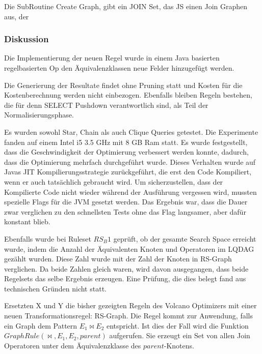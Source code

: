 Die SubRoutine Create Graph, gibt ein JOIN Set, das JS einen Join Graphen aus, der




\subsubsection{Diskussion}
Die Implementierung der neuen Regel wurde in einem Java basierten regelbasierten Op den Äquivalenzklassen neue Felder hinzugefügt werden.

Die Generierung der Resultate findet ohne Pruning statt und Kosten für die Kostenberechnung werden nicht einbezogen. Ebenfalls bleiben Regeln bestehen, die für denn SELECT Pushdown verantwortlich sind, als Teil der Normalisierungsphase. 

Es wurden sowohl Star, Chain als auch Clique Queries getestet. Die Experimente fanden auf einem Intel i5 3.5 GHz mit 8 GB Ram statt. Es wurde festgestellt, dass die Geschwindigkeit der Optimierung verbessert werden konnte, dadurch, dass die Optimierung mehrfach durchgeführt wurde. Dieses Verhalten wurde auf Javas JIT Kompilierungsstrategie zurückgeführt, die erst den Code Kompiliert, wenn er auch tatsächlich gebraucht wird. Um sicherzustellen, dass der Kompilierte Code nicht wieder während der Ausführung vergessen wird, mussten spezielle Flags für die JVM gesetzt werden. Das Ergebnis war, dass die Dauer zwar verglichen zu den schnellsten Tests ohne das Flag langsamer, aber dafür konstant blieb.

Ebenfalls wurde bei Ruleset $RS_B1$ geprüft, ob der gesamte Search Space erreicht wurde, indem die Anzahl der Äquivalenten Knoten und Operatoren im LQDAG gezählt wurden. Diese Zahl wurde mit der Zahl der Knoten in RS-Graph verglichen. Da beide Zahlen gleich waren, wird davon ausgegangen, dass beide Regelsets das selbe Ergebnis erzeugen. Eine Prüfung, die dies belegt fand aus technischen Gründen nicht statt.






Ersetzten X und Y die bisher gezeigten Regeln des Volcano Optimizers mit einer neuen Transformationsregel: RS-Graph. Die Regel kommt zur Anwendung, falls ein Graph dem Pattern $E_1 \Join E_2$ entspricht. Ist dies der Fall wird die Funktion $GraphRule(\Join, E_1, E_2, parent)$ aufgerufen. Sie erzeugt ein Set von allen Join Operatoren unter dem Äquivalenzklasse des $parent$-Knotens.







